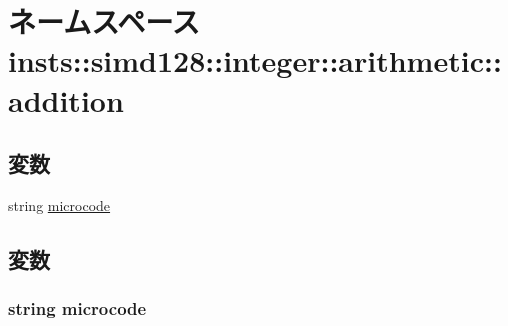 \hypertarget{namespaceinsts_1_1simd128_1_1integer_1_1arithmetic_1_1addition}{
\section{ネームスペース insts::simd128::integer::arithmetic::addition}
\label{namespaceinsts_1_1simd128_1_1integer_1_1arithmetic_1_1addition}
}
\subsection*{変数}
\begin{DoxyCompactItemize}
\item 
string \hyperlink{namespaceinsts_1_1simd128_1_1integer_1_1arithmetic_1_1addition_a770f11a173e99389a8802f0107ed8f52}{microcode}
\end{DoxyCompactItemize}


\subsection{変数}
\hypertarget{namespaceinsts_1_1simd128_1_1integer_1_1arithmetic_1_1addition_a770f11a173e99389a8802f0107ed8f52}{
\subsubsection[{microcode}]{\setlength{\rightskip}{0pt plus 5cm}string {\bf microcode}}}
\label{namespaceinsts_1_1simd128_1_1integer_1_1arithmetic_1_1addition_a770f11a173e99389a8802f0107ed8f52}
